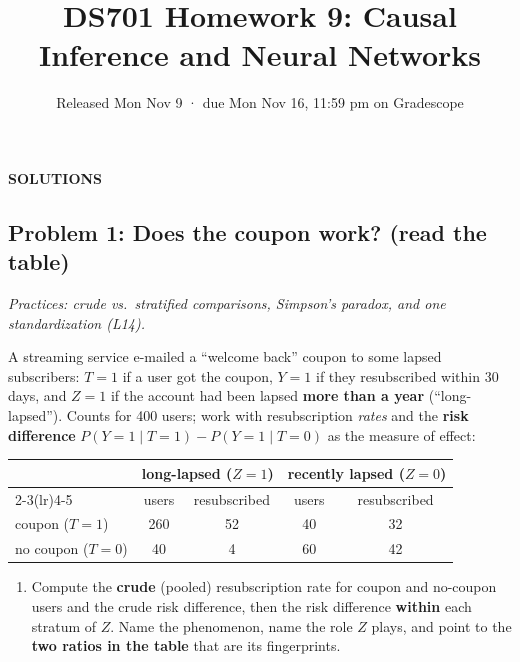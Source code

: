 \documentclass[
  11pt,
]{article}
\title{DS701 Homework 9: Causal Inference and Neural Networks}
\subtitle{Released Mon Nov 9 · due Mon Nov 16, 11:59 pm on Gradescope}
\author{}
\date{}
\providecommand{\tightlist}{%
  \setlength{\itemsep}{0pt}\setlength{\parskip}{0pt}}
\newcommand{\answerspace}[1]{\par\vspace*{#1}}  %
\newcommand{\answerpage}{\clearpage}
\begin{document}
\maketitle


\begin{center}\LARGE\bfseries\color{blue!45!black} SOLUTIONS\end{center}
\renewcommand{\answerspace}[1]{}
\renewcommand{\answerpage}{\par\vspace{6pt}}

\subsection{Problem 1: Does the coupon work? (read the
table)}\label{problem-1-does-the-coupon-work-read-the-table}

\emph{Practices: crude vs.~stratified comparisons, Simpson's paradox,
and one standardization (L14).}

A streaming service e-mailed a ``welcome back'' coupon to some lapsed
subscribers: \(T=1\) if a user got the coupon, \(Y=1\) if they
resubscribed within 30 days, and \(Z=1\) if the account had been lapsed
\textbf{more than a year} (``long-lapsed''). Counts for 400 users; work
with resubscription \emph{rates} and the \textbf{risk difference}
\(P(Y{=}1\mid T{=}1)-P(Y{=}1\mid T{=}0)\) as the measure of effect:

\begin{center}\small\setlength{\tabcolsep}{7pt}
\begin{tabular}{@{}lcccc@{}}\toprule
 & \multicolumn{2}{c}{long-lapsed ($Z{=}1$)} & \multicolumn{2}{c}{recently lapsed ($Z{=}0$)}\\
\cmidrule(lr){2-3}\cmidrule(lr){4-5}
 & users & resubscribed & users & resubscribed\\ \midrule
coupon ($T{=}1$)    & 260 & 52 & 40 & 32\\
no coupon ($T{=}0$) &  40 &  4 & 60 & 42\\
\bottomrule\end{tabular}\end{center}

\begin{enumerate}
\def\labelenumi{(\alph{enumi})}
\tightlist
\item
  Compute the \textbf{crude} (pooled) resubscription rate for coupon and
  no-coupon users and the crude risk difference, then the risk
  difference \textbf{within} each stratum of \(Z\). Name the phenomenon,
  name the role \(Z\) plays, and point to the \textbf{two ratios in the
  table} that are its fingerprints.
\end{enumerate}
\end{document}
